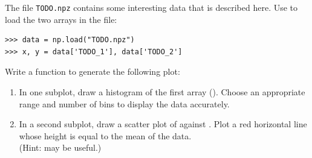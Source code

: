 \begin{problem} %
\label{prob:subplot}
The file \texttt{TODO.npz} contains some interesting data that is described here.
Use  to load the two arrays in the file:
\begin{lstlisting}
>>> data = np.load("TODO.npz")
>>> x, y = data['TODO_1'], data['TODO_2']
\end{lstlisting}

Write a function to generate the following plot:
\begin{enumerate}
\item In one subplot, draw a histogram of the first array ().
Choose an appropriate range and number of bins to display the data accurately.
\item In a second subplot, draw a scatter plot of  against . 
Plot a red horizontal line whose height is equal to the mean of the  data.\\
(Hint:  may be useful.)
\end{enumerate}


\end{problem}
